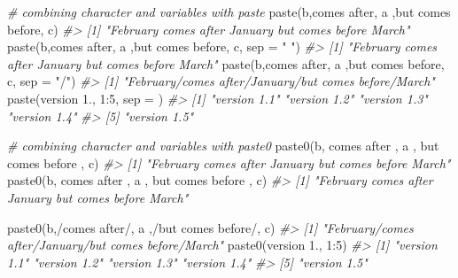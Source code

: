 \documentclass[
]{book}
\newenvironment{Shaded}{\begin{snugshade}}{\end{snugshade}}
\newcommand{\AttributeTok}[1]{\textcolor[rgb]{0.77,0.63,0.00}{#1}}
\newcommand{\CommentTok}[1]{\textcolor[rgb]{0.56,0.35,0.01}{\textit{#1}}}
\newcommand{\DecValTok}[1]{\textcolor[rgb]{0.00,0.00,0.81}{#1}}
\newcommand{\FunctionTok}[1]{\textcolor[rgb]{0.00,0.00,0.00}{#1}}
\newcommand{\NormalTok}[1]{#1}
\newcommand{\SpecialCharTok}[1]{\textcolor[rgb]{0.00,0.00,0.00}{#1}}
\newcommand{\StringTok}[1]{\textcolor[rgb]{0.31,0.60,0.02}{#1}}
\begin{document}
\begin{Shaded}
\begin{Highlighting}[]
\CommentTok{\# combining character and variables with paste}
\FunctionTok{paste}\NormalTok{(b,}\StringTok{\textquotesingle{}comes after\textquotesingle{}}\NormalTok{, a ,}\StringTok{\textquotesingle{}but comes before\textquotesingle{}}\NormalTok{, c)}
\CommentTok{\#\textgreater{} [1] "February comes after January but comes before March"}
\FunctionTok{paste}\NormalTok{(b,}\StringTok{\textquotesingle{}comes after\textquotesingle{}}\NormalTok{, a ,}\StringTok{\textquotesingle{}but comes before\textquotesingle{}}\NormalTok{, c, }\AttributeTok{sep =} \StringTok{"    "}\NormalTok{)}
\CommentTok{\#\textgreater{} [1] "February    comes after    January    but comes before    March"}
\FunctionTok{paste}\NormalTok{(b,}\StringTok{\textquotesingle{}comes after\textquotesingle{}}\NormalTok{, a ,}\StringTok{\textquotesingle{}but comes before\textquotesingle{}}\NormalTok{, c, }\AttributeTok{sep =} \StringTok{"/"}\NormalTok{)}
\CommentTok{\#\textgreater{} [1] "February/comes after/January/but comes before/March"}
\FunctionTok{paste}\NormalTok{(}\StringTok{\textquotesingle{}version 1.\textquotesingle{}}\NormalTok{, }\DecValTok{1}\SpecialCharTok{:}\DecValTok{5}\NormalTok{, }\AttributeTok{sep =} \StringTok{\textquotesingle{}\textquotesingle{}}\NormalTok{)}
\CommentTok{\#\textgreater{} [1] "version 1.1" "version 1.2" "version 1.3" "version 1.4"}
\CommentTok{\#\textgreater{} [5] "version 1.5"}

\CommentTok{\# combining character and variables with paste0}
\FunctionTok{paste0}\NormalTok{(b,}\StringTok{\textquotesingle{} comes after \textquotesingle{}}\NormalTok{, a ,}\StringTok{\textquotesingle{} but comes before \textquotesingle{}}\NormalTok{, c)}
\CommentTok{\#\textgreater{} [1] "February comes after January but comes before March"}
\FunctionTok{paste0}\NormalTok{(b,}\StringTok{\textquotesingle{}    comes after    \textquotesingle{}}\NormalTok{, a ,}\StringTok{\textquotesingle{}    but comes before    \textquotesingle{}}\NormalTok{, c)}
\CommentTok{\#\textgreater{} [1] "February    comes after    January    but comes before    March"}

\FunctionTok{paste0}\NormalTok{(b,}\StringTok{\textquotesingle{}/comes after/\textquotesingle{}}\NormalTok{, a ,}\StringTok{\textquotesingle{}/but comes before/\textquotesingle{}}\NormalTok{, c)}
\CommentTok{\#\textgreater{} [1] "February/comes after/January/but comes before/March"}
\FunctionTok{paste0}\NormalTok{(}\StringTok{\textquotesingle{}version 1.\textquotesingle{}}\NormalTok{, }\DecValTok{1}\SpecialCharTok{:}\DecValTok{5}\NormalTok{)}
\CommentTok{\#\textgreater{} [1] "version 1.1" "version 1.2" "version 1.3" "version 1.4"}
\CommentTok{\#\textgreater{} [5] "version 1.5"}
\end{Highlighting}
\end{Shaded}
\end{document}
